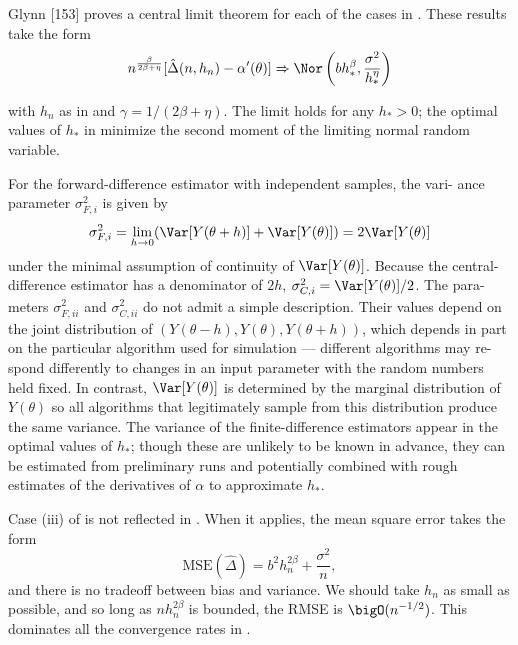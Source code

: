 Glynn [153] proves a central limit theorem for each of the cases in .
These results take the form
\begin{equation} \label{CentralLimitTheoremGlynn}
	n^{\frac{\beta}{2\beta+\eta}} [\hat{\Delta}(n, h_n) - \alpha'(\theta)] \Rightarrow \Nor \left( b h_*^\beta, \frac{\sigma^2}{h_*^\eta} \right)
\end{equation}

with \(h_n\) as in  and \(\gamma = 1/(2\beta + \eta)\). The limit holds for any \(h_* > 0\); the
optimal values of \(h_*\) in  minimize the second moment of the limiting
normal random variable.

For the forward-difference estimator with independent samples, the vari-
ance parameter \(\sigma_{F,i}^2\) is given by
\begin{equation} \label{VarianceParameterForwardIndependent}
	\sigma_{F,i}^2 = \lim_{h\to 0} (\Var[Y(\theta + h)] + \Var[Y(\theta)]) = 2\Var[Y(\theta)]
\end{equation}
under the minimal assumption of continuity of \(\Var[Y(\theta)]\). Because the central-
difference estimator has a denominator of \(2h\), \(\sigma_{C,i}^2 = \Var[Y(\theta)]/2\). The para-
meters \(\sigma_{F,ii}^2\) and \(\sigma_{C,ii}^2\) do not admit a simple description. Their values depend
on the joint distribution of \((Y(\theta - h), Y(\theta), Y(\theta + h))\), which depends in part
on the particular algorithm used for simulation --- different algorithms may re-
spond differently to changes in an input parameter with the random numbers
held fixed. In contrast, \(\Var[Y(\theta)]\) is determined by the marginal distribution of
\(Y(\theta)\) so all algorithms that legitimately sample from this distribution produce
the same variance. The variance of the finite-difference estimators appear in
the optimal values of \(h_*\); though these are unlikely to be known in advance,
they can be estimated from preliminary runs and potentially combined with
rough estimates of the derivatives of \(\alpha\) to approximate \(h_*\).

Case (iii) of  is not reflected in . When it applies, the mean
square error takes the form
\begin{equation} \label{MeanSquareErrorCaseThree}
	\mathrm{MSE}(\hat{\Delta}) = b^2 h_n^{2\beta} + \frac{\sigma^2}{n} ,
\end{equation}
and there is no tradeoff between bias and variance. We should take \(h_n\) as
small as possible, and so long as \(nh_n^{2\beta}\) is bounded, the RMSE is \(\bigO(n^{-1/2})\).
This dominates all the convergence rates in .

